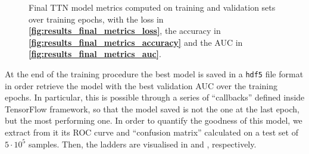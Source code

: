\documentclass[../main/main.tex]{subfiles}
\begin{document}
\begin{figure}[h]
\begin{minipage}[c]{0.333\linewidth}
{        }
    \end{minipage}%
    \begin{minipage}[c]{0.333\linewidth}
        \vspace{0pt}
        \centering
    \end{minipage}%
    \caption{Final TTN model metrics computed on training and validation sets over training epochs, with the loss in \textbf{\ref{fig:results_final_metrics_loss}}, the accuracy in \textbf{\ref{fig:results_final_metrics_accuracy}} and the AUC in \textbf{\ref{fig:results_final_metrics_auc}}.}
    \label{fig:results_final_metrics}
\end{figure}


At the end of the training procedure the best model is saved in a \texttt{hdf5} file format in order retrieve the model with the best validation AUC over the training epochs. In particular, this is possible through a series of ``callbacks'' defined inside TensorFlow framework, so that the model saved is not the one at the last epoch, but the most performing one. In order to quantify the goodness of this model, we extract from it its ROC curve and ``confusion matrix'' calculated on a test set of \( 5 \cdot 10^{5} \) samples. Then, the ladders are visualised in  and , respectively.
\end{document}
